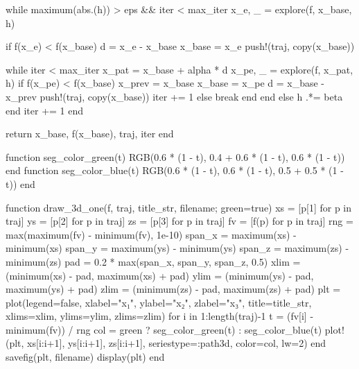 \documentclass[a4paper, 14pt]{extarticle}
\begin{document}
\begin{breakablelisting}
    while maximum(abs.(h)) > eps && iter < max_iter
        x_e, _ = explore(f, x_base, h)

        if f(x_e) < f(x_base)
            d = x_e - x_base
            x_base = x_e
            push!(traj, copy(x_base))

            while iter < max_iter
                x_pat = x_base + alpha * d
                x_pe, _ = explore(f, x_pat, h)
                if f(x_pe) < f(x_base)
                    x_prev = x_base
                    x_base = x_pe
                    d = x_base - x_prev
                    push!(traj, copy(x_base))
                    iter += 1
                else
                    break
                end
            end
        else
            h .*= beta
        end
        iter += 1
    end

    return x_base, f(x_base), traj, iter
end

function seg_color_green(t)
    RGB(0.6 * (1 - t), 0.4 + 0.6 * (1 - t), 0.6 * (1 - t))
end
function seg_color_blue(t)
    RGB(0.6 * (1 - t), 0.6 * (1 - t), 0.5 + 0.5 * (1 - t))
end

function draw_3d_one(f, traj, title_str, filename; green=true)
    xs = [p[1] for p in traj]
    ys = [p[2] for p in traj]
    zs = [p[3] for p in traj]
    fv = [f(p) for p in traj]
    rng = max(maximum(fv) - minimum(fv), 1e-10)
    span_x = maximum(xs) - minimum(xs)
    span_y = maximum(ys) - minimum(ys)
    span_z = maximum(zs) - minimum(zs)
    pad = 0.2 * max(span_x, span_y, span_z, 0.5)
    xlim = (minimum(xs) - pad, maximum(xs) + pad)
    ylim = (minimum(ys) - pad, maximum(ys) + pad)
    zlim = (minimum(zs) - pad, maximum(zs) + pad)
    plt = plot(legend=false, xlabel="x₁", ylabel="x₂", zlabel="x₃", title=title_str, xlims=xlim, ylims=ylim, zlims=zlim)
    for i in 1:length(traj)-1
        t = (fv[i] - minimum(fv)) / rng
        col = green ? seg_color_green(t) : seg_color_blue(t)
        plot!(plt, xs[i:i+1], ys[i:i+1], zs[i:i+1], seriestype=:path3d, color=col, lw=2)
    end
    savefig(plt, filename)
    display(plt)
end


\end{breakablelisting}
\end{document}
